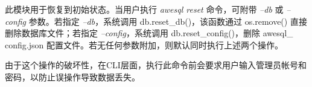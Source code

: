 \begin{CJK*}{UTF8}{song}

此模块用于恢复到初始状态。当用户执行 \textit{awesql reset} 命令，可附带 \textit{--db} 或 \textit{--config} 参数。若指定 \textit{--db}，系统调用 db.reset\_db()，该函数通过 os.remove() 直接删除数据库文件；若指定 \textit{--config}，系统调用 db.reset\_config()，删除 awesql\_ config.json 配置文件。若无任何参数附加，则默认同时执行上述两个操作。

由于这个操作的破坏性，在CLI层面，执行此命令前会要求用户输入管理员帐号和密码，以防止误操作导致数据丢失。

\end{CJK*}